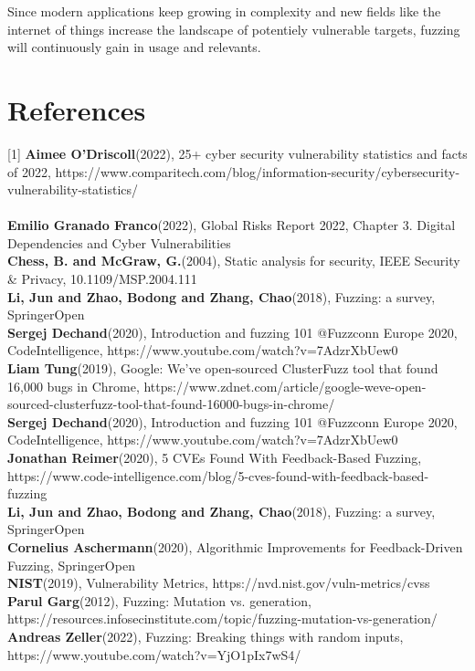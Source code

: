 \documentclass[journal=tosc,final]{iacrtrans}
\begin{document}
Since modern applications keep growing in complexity and new fields like the internet of things increase the landscape of potentiely vulnerable targets, fuzzing will continuously gain in usage and relevants.
\section{References}
[1] \textbf{Aimee O'Driscoll}(2022), 25+ cyber security vulnerability statistics and facts of 2022, https://www.comparitech.com/blog/information-security/cybersecurity-vulnerability-statistics/\\
\\
\noindent[2] \textbf{Emilio Granado Franco}(2022),  Global Risks Report 2022, Chapter 3. Digital Dependencies and Cyber Vulnerabilities\\

\noindent[3] \textbf{Chess, B. and McGraw, G.}(2004), Static analysis for security, IEEE Security \& Privacy, 10.1109/MSP.2004.111
\\


\noindent[4] \textbf{Li, Jun and Zhao, Bodong and Zhang, Chao}(2018),     Fuzzing: a survey, SpringerOpen
\\

\noindent [5] \textbf{Sergej Dechand}(2020), Introduction and fuzzing 101 @Fuzzconn Europe 2020, CodeIntelligence, https://www.youtube.com/watch?v=7AdzrXbUew0
\\

\noindent [6] \textbf{Liam Tung}(2019),  Google: We've open-sourced ClusterFuzz tool that found 16,000 bugs in Chrome, https://www.zdnet.com/article/google-weve-open-sourced-clusterfuzz-tool-that-found-16000-bugs-in-chrome/
\\

\noindent [7] \textbf{Sergej Dechand}(2020), Introduction and fuzzing 101 @Fuzzconn Europe 2020, CodeIntelligence, https://www.youtube.com/watch?v=7AdzrXbUew0
\\

\noindent[8] \textbf{Jonathan Reimer}(2020), 5 CVEs Found With Feedback-Based Fuzzing, https://www.code-intelligence.com/blog/5-cves-found-with-feedback-based-fuzzing
\\

\noindent[9] \textbf{Li, Jun and Zhao, Bodong and Zhang, Chao}(2018),     Fuzzing: a survey, SpringerOpen
\\


\noindent[10] \textbf{Cornelius Aschermann}(2020), Algorithmic Improvements for
Feedback-Driven Fuzzing, SpringerOpen
\\

\noindent[11] \textbf{NIST}(2019), Vulnerability Metrics, https://nvd.nist.gov/vuln-metrics/cvss
\\

\noindent[12] \textbf{Parul Garg}(2012), Fuzzing: Mutation vs. generation, https://resources.infosecinstitute.com/topic/fuzzing-mutation-vs-generation/
\\

\noindent[13] \textbf{Andreas Zeller}(2022), Fuzzing: Breaking things with random inputs, https://www.youtube.com/watch?v=YjO1pIx7wS4/
\\
\end{document}
